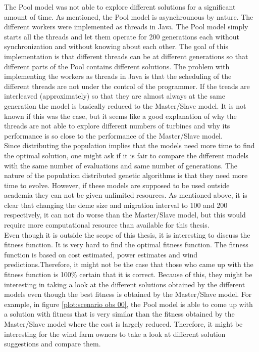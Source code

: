 \noindent The Pool model was not able to explore different solutions for a significant amount of time. As mentioned, the Pool model is asynchrounous by nature. The different workers were implemented as threads in Java. The Pool model simply starts all the threads and let them operate for 200 generations each without synchronization and without knowing about each other. The goal of this implementation is that different threads can be at different generations so that different parts of the Pool contains different solutions. The problem with implementing the workers as threads in Java is that the scheduling of the different threads are not under the control of the programmer. If the treads are interleaved (approximately) so that they are almost always at the same generation the model is basically reduced to the Master/Slave model. It is not known if this was the case, but it seems like a good explanation of why the threads are not able to explore different numbers of turbines and why its performance is so close to the performance of the Master/Slave model.\\


\noindent Since distributing the population implies that the models need more time to find the optimal solution, one might ask if it is fair to compare the different models with the same number of evaluations and same number of generations. The nature of the population distributed genetic algorithms is that they need more time to evolve. However, if these models are supposed to be used outside academia they can not be given unlimited resources. As mentioned above, it is clear that changing the deme size and migration interval to 100 and 200 respectively, it can not do worse than the Master/Slave model, but this would require more computational resource than available for this thesis.\\


\noindent Even though it is outside the scope of this thesis, it is interesting to discuss the fitness function. It is very hard to find the optimal fitness function. The fitness function is based on cost estimated, power estimates and wind predictions.Therefore, it might not be the case that those who came up with the fitness function is 100\% certain that it is correct. Because of this, they might be interesting in taking a look at the different solutions obtained by the different models even though the best fitness is obtained by the Master/Slave model. For example, in figure \ref{plot:scenario obs 00}, the Pool model is able to come up with a solution with fitness that is very similar than the fitness obtained by the Master/Slave model where the cost is largely reduced. Therefore, it might be interesting for the wind farm owners to take a look at different solution suggestions and compare them.\\


